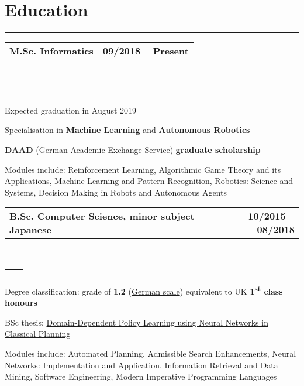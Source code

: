 \documentclass[]{deedy-resume}
\makeatletter
\newcommand{\headerrow}[2]
{\begin{tabular*}{\linewidth}{l@{\extracolsep{\fill}}r}
	\fontspec{Helvetica}\fontsize{12pt}{12pt}\selectfont\bfseries{\color{subheadings}#1} &
	\fontspec{Helvetica}\fontsize{12pt}{12pt}\selectfont\bfseries{\color{subheadings}#2} \\
\end{tabular*}}
\newcommand{\locationrow}[2]
{\begin{tabular*}{\linewidth}{l@{\extracolsep{\fill}}r}
        \color{headings}\scshape\fontspec{Heiti TC Medium}\fontsize{10pt}{12pt}\selectfont{#1}  &
        \color{headings}\scshape\fontspec{Heiti TC Medium}\fontsize{10pt}{12pt}\selectfont{#2}  \\
\end{tabular*}}
\makeatother
\begin{document}
\section*{Education}
\hrule
\vspace{0.4em}

\noindent
\headerrow{M.Sc. Informatics}{09/2018 -- Present}
\\
\locationrow{University of Edinburgh}{Edinburgh, United Kingdom}
\begin{tightitemize}{1.7em}
    \item Expected graduation in August 2019
    \item Specialisation in \textbf{Machine Learning} and \textbf{Autonomous Robotics}
    \item \textbf{DAAD} (German Academic Exchange Service) \textbf{graduate scholarship}
    \item Modules include: Reinforcement Learning, Algorithmic Game Theory and its Applications, Machine Learning and Pattern Recognition, Robotics: Science and Systems, Decision Making in Robots and Autonomous Agents
\end{tightitemize}
\largesectionsep

\noindent
\headerrow{B.Sc. Computer Science, minor subject Japanese}{10/2015 -- 08/2018}
\\
\locationrow{Saarland University}{Saarbrücken, Germany}
\begin{tightitemize}{1.7em}
    \item Degree classification: grade of \textbf{1.2} (\href{https://en.wikipedia.org/wiki/Academic_grading_in_Germany}{German scale}) equivalent to UK \textbf{1\textsuperscript{st} class honours}
    \item BSc thesis: \href{https://www.lukaschaefer.de/assets/files/thesis.pdf}{Domain-Dependent Policy Learning using Neural Networks in Classical Planning}
    \item Modules include: Automated Planning, Admissible Search Enhancements, Neural Networks: Implementation and Application, Information Retrieval and Data Mining, Software Engineering, Modern Imperative Programming Languages
\end{tightitemize}
\largesectionsep
\end{document}
